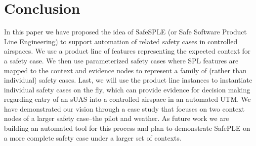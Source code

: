 \section{Conclusion}

In this paper we have proposed the idea of SafeSPLE (or Safe Software Product Line Engineering) to support automation of related safety cases in controlled airspaces. We use a product line of features representing the expected context for a safety case. We then use parameterized safety cases where SPL features are mapped to the context and evidence nodes to  represent a family of (rather than individual) safety cases. Last, we will use the product line instances to instantiate individual safety cases on the fly, which can provide evidence for decision making regarding entry of an sUAS into a controlled airspace in an automated UTM. We have demonstrated our vision through a case study that focuses on two context nodes of a larger safety case--the pilot and weather. As future work we are building an automated tool for this process and plan to demonstrate SafePLE on a more complete safety case under a larger set of contexts.